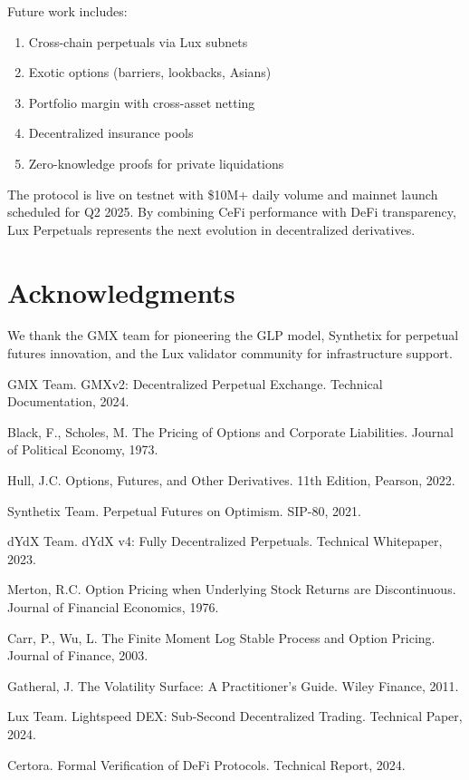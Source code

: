 \documentclass[11pt,a4paper]{article}
\begin{document}
Future work includes:
\begin{enumerate}
    \item Cross-chain perpetuals via Lux subnets
    \item Exotic options (barriers, lookbacks, Asians)
    \item Portfolio margin with cross-asset netting
    \item Decentralized insurance pools
    \item Zero-knowledge proofs for private liquidations
\end{enumerate}

The protocol is live on testnet with \$10M+ daily volume and mainnet launch scheduled for Q2 2025. By combining CeFi performance with DeFi transparency, Lux Perpetuals represents the next evolution in decentralized derivatives.

\section*{Acknowledgments}

We thank the GMX team for pioneering the GLP model, Synthetix for perpetual futures innovation, and the Lux validator community for infrastructure support.


\begin{thebibliography}{99}

GMX Team. GMXv2: Decentralized Perpetual Exchange. Technical Documentation, 2024.

Black, F., Scholes, M. The Pricing of Options and Corporate Liabilities. Journal of Political Economy, 1973.

Hull, J.C. Options, Futures, and Other Derivatives. 11th Edition, Pearson, 2022.

Synthetix Team. Perpetual Futures on Optimism. SIP-80, 2021.

dYdX Team. dYdX v4: Fully Decentralized Perpetuals. Technical Whitepaper, 2023.

Merton, R.C. Option Pricing when Underlying Stock Returns are Discontinuous. Journal of Financial Economics, 1976.

Carr, P., Wu, L. The Finite Moment Log Stable Process and Option Pricing. Journal of Finance, 2003.

Gatheral, J. The Volatility Surface: A Practitioner's Guide. Wiley Finance, 2011.

Lux Team. Lightspeed DEX: Sub-Second Decentralized Trading. Technical Paper, 2024.

Certora. Formal Verification of DeFi Protocols. Technical Report, 2024.

\end{thebibliography}
\end{document}
